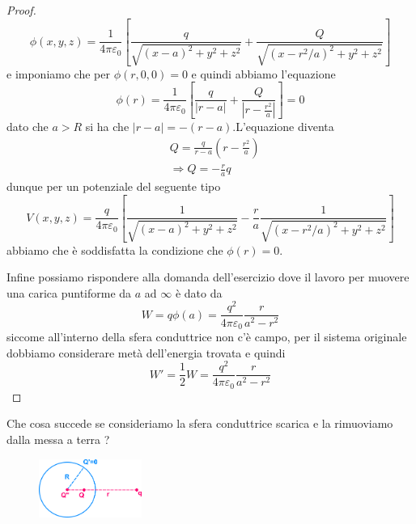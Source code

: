 \begin{proof}
\begin{equation*}
	\phi(x,y,z) = \frac{1}{4 \pi \varepsilon_0} \left [ \frac{q}{\sqrt{(x-a)^2+y^2+z^2}} + \frac{Q}{\sqrt{(x-r^2/a)^2 +y^2+z^2}}\right]
\end{equation*}
e imponiamo che per $\phi(r,0,0) = 0$  e quindi abbiamo l'equazione 
\begin{equation*}
	\phi(r) = \frac{1}{4 \pi \varepsilon_0} \left [ \frac{q}{|r-a|} + \frac{Q}{|r - \frac{r^2}{a}|}\right] = 0
\end{equation*}
dato che $a >R$ si ha che $|r-a| = -(r-a)$.L'equazione diventa
\begin{align*}
	& Q = \frac{q}{r-a}\left ( r-\frac{r^2}{a}\right)\\[0.5cm] 
	& \Rightarrow \boxed{Q = -\frac{r}{a}q}
\end{align*}
dunque per un potenziale del seguente tipo 
\begin{equation*}
	V(x,y,z) = \frac{q}{4 \pi \varepsilon_0} \left [ \frac{1}{\sqrt{(x-a)^2 +y^2 + z^2}} - \frac{r}{a}\frac{1}{\sqrt{(x- r^2/a)^2+y^2 +z^2}}\right]
\end{equation*}
abbiamo che \`e soddisfatta la condizione che $\phi(r) = 0$.

Infine possiamo rispondere alla domanda dell'esercizio dove il lavoro per muovere una carica puntiforme da $a$ ad $\infty$ \`e dato da
\begin{equation*}
	W = q \phi(a) = \frac{q^2}{4 \pi \varepsilon_0} \frac{r}{a^2-r^2} 
\end{equation*}
siccome all'interno della sfera conduttrice non c'\`e campo, per il sistema originale dobbiamo considerare met\`a dell'energia trovata e quindi
\begin{equation*}
	W' = \frac{1}{2}W = \frac{q^2}{4 \pi \varepsilon_0} \frac{r}{a^2-r^2}
\end{equation*}

\end{proof}

Che cosa succede se consideriamo la sfera conduttrice scarica e la rimuoviamo dalla messa a terra ?

 \begin{figure} %
    \centering
    \includegraphics[width=0.3\textwidth]{images/spherecharge1} %
\end{figure}

